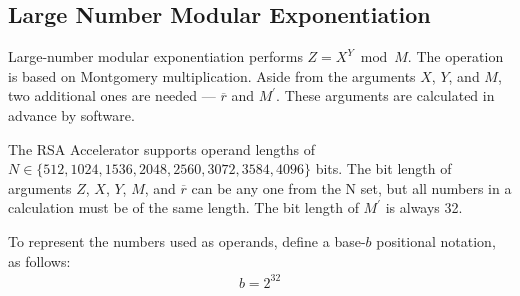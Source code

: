 \documentclass[main\_\_EN.tex]{subfiles}
\begin{document}
\subsection{Large Number Modular Exponentiation}

Large-number modular exponentiation performs \begin{math}Z = X^{Y} \bmod M\end{math}. The operation is based on Montgomery multiplication. Aside from the arguments
\begin{math}X\end{math},
\begin{math}Y\end{math}, and
\begin{math}M\end{math}, two additional ones are needed --- \begin{math}\overline{r}\end{math} and
\begin{math}M^{\prime}\end{math}. These arguments are calculated in advance by software.

The RSA Accelerator supports operand lengths of
\begin{math}N \in \{512,1024,1536,2048,2560,3072,3584,4096\}\end{math} bits. The bit length of arguments
\begin{math}Z\end{math},
\begin{math}X\end{math},
\begin{math}Y\end{math},
\begin{math}M\end{math}, and 
\begin{math}\overline{r}\end{math}
can be any one from the N set, but all numbers in a calculation must be of the same length. The bit length of \begin{math}M^{\prime}\end{math} is always 32.

To represent the numbers used as operands, define a base-\begin{math}b\end{math} positional notation, as follows:
\begin{gather*}
    b = 2^{32}
\end{gather*}
\end{document}
